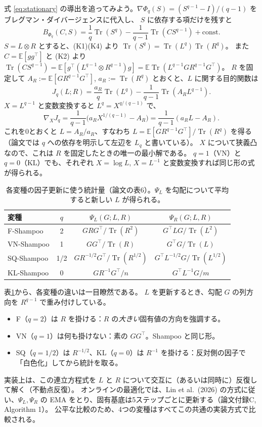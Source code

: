 \documentclass[a4paper,11pt]{ltjsarticle}
\theoremstyle{definition}
\theoremstyle{plain}
\newcommand{\E}{\mathbb{E}}
\DeclareMathOperator{\Tr}{Tr}
\newcommand{\T}{^{\top}}
\begin{document}
式 \eqref{eq:stationary} の導出を追ってみよう。$\nabla\Phi_q(S) = (S^{q-1} - I)/(q-1)$ をブレグマン・ダイバージェンスに代入し、
$S$ に依存する項だけを残すと
\[
  B_{\Phi_q}(C, S) = \frac1q\Tr(S^q) - \frac1{q-1}\Tr(CS^{q-1}) + \text{const}.
\]
$S = L\otimes R$ とすると、(K1)(K4) より $\Tr(S^q) = \Tr(L^q)\Tr(R^q)$。
また $C = \E[gg\T]$ と (K2) より $\Tr(CS^{q-1}) = \E[g\T(L^{q-1}\otimes R^{q-1})g] = \E\Tr(L^{q-1}GR^{q-1}G\T)$。
$R$ を固定して $A_R := \E[GR^{q-1}G\T]$, $a_R := \Tr(R^q)$ とおくと、$L$ に関する目的関数は
\[
  J_q(L;R) = \frac{a_R}{q}\Tr(L^q) - \frac{1}{q-1}\Tr(A_RL^{q-1}).
\]
$X = L^{q-1}$ と変数変換すると $L^q = X^{q/(q-1)}$ で、
\[
  \nabla_X J_q = \frac{1}{q-1}\bigl(a_R X^{1/(q-1)} - A_R\bigr) = \frac{1}{q-1}(a_RL - A_R).
\]
これを0とおくと $L = A_R/a_R$、すなわち
$L = \E[GR^{q-1}G\T]/\Tr(R^q)$ を得る（論文では $q$ への依存を明示して左辺を $L_q$ と書いている）。
$X$ について狭義凸なので、これは $R$ を固定したときの唯一の最小解である。
$q=1$（VN）と $q=0$（KL）でも、それぞれ $X = \log L$, $X = L^{-1}$ と変数変換すれば同じ形の式が得られる。

\begin{table}[t]
\centering
\caption{各変種の因子更新に使う統計量（論文の表6）。$\Psi_L$ を勾配について平均すると新しい $L$ が得られる。}
\label{tab:stats}
\renewcommand{\arraystretch}{1.3}
\begin{tabular}{lccc}
\toprule
変種 & $q$ & $\Psi_L(G;L,R)$ & $\Psi_R(G;L,R)$\\
\midrule
F-Shampoo  & 2   & $GRG\T/\Tr(R^2)$ & $G\T LG/\Tr(L^2)$\\
VN-Shampoo & 1   & $GG\T/\Tr(R)$ & $G\T G/\Tr(L)$\\
SQ-Shampoo & 1/2 & $GR^{-1/2}G\T/\Tr(R^{1/2})$ & $G\T L^{-1/2}G/\Tr(L^{1/2})$\\
KL-Shampoo & 0   & $GR^{-1}G\T/n$ & $G\T L^{-1}G/m$\\
\bottomrule
\end{tabular}
\end{table}

表\ref{tab:stats}から、各変種の違いは一目瞭然である。
$L$ を更新するとき、勾配 $G$ の列方向を $R^{q-1}$ で重み付けしている。
\begin{itemize}
  \item F（$q=2$）は $R$ を掛ける：$R$ の\emph{大きい}固有値の方向を強調する。
  \item VN（$q=1$）は何も掛けない：素の $GG\T$。Shampoo と同じ形。
  \item SQ（$q=1/2$）は $R^{-1/2}$、KL（$q=0$）は $R^{-1}$ を掛ける：反対側の因子で「白色化」してから統計を取る。
\end{itemize}
実装上は、この連立方程式を $L$ と $R$ について交互に（あるいは同時に）反復して解く（不動点反復）。
オンラインの最適化では、Lin et al.\ (2026) の方式に従い、$\Psi_L, \Psi_R$ の EMA をとり、固有基底は5ステップごとに更新する（論文付録C, Algorithm 1）。
公平な比較のため、4つの変種はすべてこの共通の実装方式で比較される。
\end{document}
